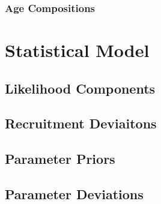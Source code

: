 \documentclass[11pt,
  english,
  letterpaper,
]{article}
\begin{document}
\leavevmode\tagmcend\tagstructend


\hypertarget{age-compositions}{%
\subsubsection{Age Compositions}\label{age-compositions}}

\leavevmode\tagmcend\tagstructend


\hypertarget{statistical-model}{%
\section{Statistical Model}\label{statistical-model}}

\leavevmode\tagmcend\tagstructend


\hypertarget{likelihood-components}{%
\subsection{Likelihood Components}\label{likelihood-components}}

\leavevmode\tagmcend\tagstructend


\hypertarget{recruitment-deviaitons}{%
\subsection{Recruitment Deviaitons}\label{recruitment-deviaitons}}

\leavevmode\tagmcend\tagstructend


\hypertarget{parameter-priors}{%
\subsection{Parameter Priors}\label{parameter-priors}}

\leavevmode\tagmcend\tagstructend


\hypertarget{parameter-deviations}{%
\subsection{Parameter Deviations}\label{parameter-deviations}}
\end{document}
